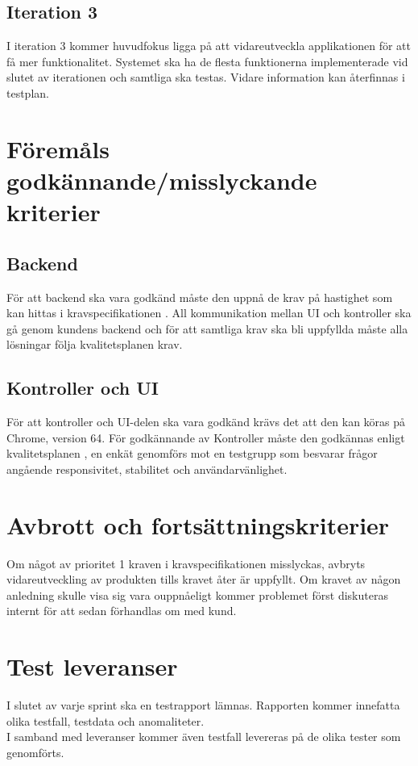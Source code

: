 \documentclass[10pt]{article}
\begin{document}
\subsection{Iteration 3}
	I iteration 3 kommer huvudfokus ligga på att vidareutveckla applikationen för att få mer funktionalitet. Systemet ska ha de flesta funktionerna implementerade vid slutet av iterationen och samtliga ska testas. Vidare information kan återfinnas i testplan.
	
	
	

\section{Föremåls godkännande/misslyckande kriterier}
	\subsection{Backend}
		För att backend ska vara godkänd måste den uppnå de krav på hastighet som kan hittas i kravspecifikationen \cite{bib-kravspec}. All kommunikation mellan UI och kontroller ska gå genom kundens backend och för att samtliga krav ska bli uppfyllda måste alla lösningar följa kvalitetsplanen  \cite{bib-kvalitetsplan} krav.

	\subsection{Kontroller och UI}
		För att kontroller och UI-delen ska vara godkänd krävs det att den kan köras på Chrome, version 64. För godkännande av Kontroller måste den godkännas enligt kvalitetsplanen \cite{bib-kvalitetsplan}, en enkät genomförs mot en testgrupp som besvarar frågor angående responsivitet, stabilitet och användarvänlighet.



\section{Avbrott och fortsättningskriterier}
	Om något av prioritet 1 kraven i kravspecifikationen \cite{bib-kravspec} misslyckas, avbryts vidareutveckling av produkten tills kravet åter är uppfyllt. Om kravet av någon anledning skulle visa sig vara ouppnåeligt kommer problemet först diskuteras internt för att sedan förhandlas om med kund. 



\section{Test leveranser}
	I slutet av varje sprint ska en testrapport lämnas. Rapporten kommer innefatta olika testfall, testdata och anomaliteter.
	\\
	I samband med leveranser kommer även testfall levereras på de olika tester som genomförts. 
\end{document}
